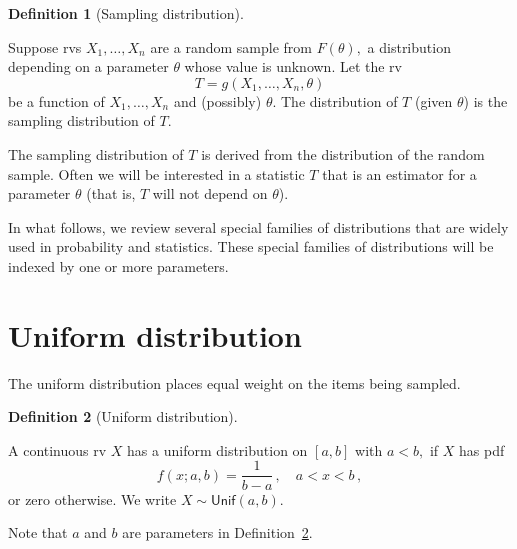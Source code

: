 \documentclass[
  a4paper,
  DIV=11,
  numbers=noendperiod,
  oneside]{scrreprt}
\theoremstyle{definition}
\theoremstyle{definition}
\newtheorem{definition}{Definition}[chapter]
\theoremstyle{plain}
\theoremstyle{plain}
\theoremstyle{definition}
\theoremstyle{remark}
\begin{document}
\begin{definition}[Sampling
distribution]\protect\hypertarget{def-sampling-dist}{}\label{def-sampling-dist}

Suppose rvs \(X_1, \dots, X_n\) are a random sample from \(F(\theta),\)
a distribution depending on a parameter \(\theta\) whose value is
unknown. Let the rv \[T = g(X_1, \dots, X_n, \theta)\] be a function of
\(X_1, \dots, X_n\) and (possibly) \(\theta\). The distribution of \(T\)
(given \(\theta\)) is the sampling distribution of \(T\).

\end{definition}

The sampling distribution of \(T\) is derived from the distribution of
the random sample. Often we will be interested in a statistic \(T\) that
is an estimator for a parameter \(\theta\) (that is, \(T\) will not
depend on \(\theta\)).

In what follows, we review several special families of distributions
that are widely used in probability and statistics. These special
families of distributions will be indexed by one or more parameters.

\section{Uniform distribution}\label{sec-uniform-distribution}

The uniform distribution places equal weight on the items being sampled.

\begin{definition}[Uniform
distribution]\protect\hypertarget{def-uniform-dist}{}\label{def-uniform-dist}

A continuous rv \(X\) has a uniform distribution on \([a,b]\) with
\(a<b,\) if \(X\) has pdf \[
 f(x; a,b) = \frac{1}{b-a}\,, 
 \quad a < x < b\,,
\] or zero otherwise. We write \(X \sim \mathsf{Unif}(a,b)\).

\end{definition}

\begin{tcolorbox}[enhanced jigsaw, toptitle=1mm, colback=white, left=2mm, arc=.35mm, breakable, colframe=quarto-callout-warning-color-frame, titlerule=0mm, coltitle=black, leftrule=.75mm, title=\textcolor{quarto-callout-warning-color}{\faExclamationTriangle}\hspace{0.5em}{Parameters}, opacitybacktitle=0.6, bottomtitle=1mm, colbacktitle=quarto-callout-warning-color!10!white, opacityback=0, rightrule=.15mm, bottomrule=.15mm, toprule=.15mm]

Note that \(a\) and \(b\) are parameters in
Definition~\ref{def-uniform-dist}.

\end{tcolorbox}
\end{document}
